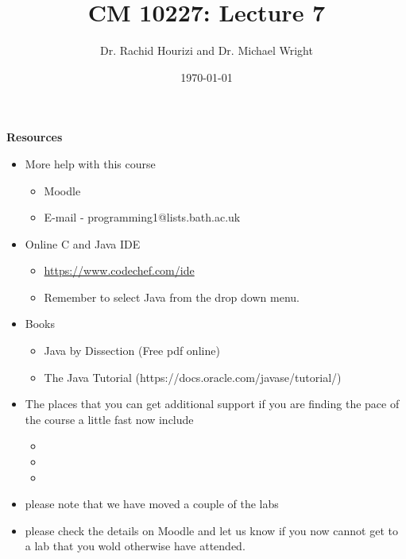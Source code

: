 \documentclass{beamer}
\begin{document}

\title{CM 10227: Lecture 7}
\author{Dr. Rachid Hourizi and Dr. Michael Wright}
\date{\today}
\frame{\titlepage}

\begin{frame}
\begin{center}
\textbf{Resources}
\end{center}
\begin{itemize}
\item More help with this course
\begin{itemize}
\item Moodle
\item E-mail - programming1@lists.bath.ac.uk
\end{itemize}
\item Online C \alert{and Java} IDE
\begin{itemize}
\item \url{https://www.codechef.com/ide}
\item Remember to select Java from the drop down menu.
\end{itemize}
\item Books
\begin{itemize}
\item Java by Dissection (Free pdf online)
\item The Java Tutorial (https://docs.oracle.com/javase/tutorial/)
\end{itemize}
\end{itemize}
\end{frame}

\begin{frame} 
\begin{itemize}
\item The places that you can get additional support if you are finding the pace of the course a little fast now include
\begin{itemize}
\item {}
\item {}
\item {}
\end{itemize}
\item please note that we have moved a couple of the labs
\item please check the details on Moodle and let us know if you now cannot get to a lab that you wold otherwise have attended.
\end{itemize}
\end{frame}
\end{document}
